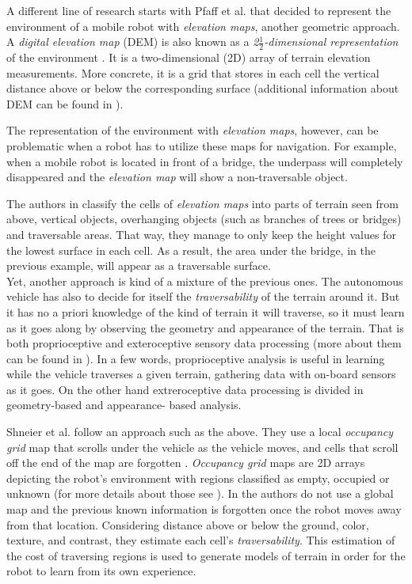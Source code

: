 \documentclass[12pt,a4paper]{report}
\newcommand{\term}{\textit}
\newcommand{\acronym}{\MakeUppercase}
\newcommand{\itfrac}[2]{\frac{\textit{#1}}{\textit{#2}}}
\begin{document}
	A different line of research starts with Pfaff et al. that decided to represent 
	the environment of a mobile robot with \term{elevation maps}, another geometric 
	approach. A \term{digital elevation map} (\acronym{dem}) is also known as a
	\term{2\(\itfrac{1}{2}\)-dimensional representation} of the environment 
	\cite{Pfaff}. It is a two-dimensional (\acronym{2d}) array of terrain elevation 
	measurements. More concrete, it is a grid that stores in each cell the vertical 
	distance above or below the corresponding surface (additional information about 
	\acronym{dem} can be found in \cite{Kweon}). 
	\par 
	The representation of the environment with \term{elevation maps}, however, can 
	be problematic when a robot has to utilize these maps for navigation. For 
	example, when a mobile robot is located in front of a bridge, the underpass will 
	completely disappeared and the \term{elevation map} will show a non-traversable 
	object.
	\par
	The authors in \cite{Pfaff} classify the cells of \term{elevation maps} into 
	parts of terrain seen from above, vertical objects,	overhanging objects (such as 
	branches of trees or bridges) and traversable areas. That way, they manage to 
	only keep the height values for the lowest surface in each cell. As a result, 
	the area under the bridge, in the previous example, will appear as a traversable 
	surface.
	\\
	
	Yet, another approach is kind of a mixture of the previous ones. The autonomous 
	vehicle has also to decide for itself the \term{traversability} of the terrain 
	around it. But it has no a priori knowledge of the kind of terrain it will 
	traverse, so it must learn as it goes along by observing the geometry and 
	appearance of the terrain. That is both proprioceptive and exteroceptive sensory 
	data processing (more about them can be found in \cite{Papadakis}). In a few 
	words, proprioceptive analysis is useful in learning while the vehicle traverses 
	a given terrain, gathering data with on-board sensors as it goes. On the other 
	hand extreroceptive data processing is divided in geometry-based and appearance-
	based analysis. 
	\par
	Shneier et al. follow an approach such as the above. They use a local 
	\term{occupancy grid} map that scrolls under the vehicle as the vehicle moves,
	and cells that scroll off the end of the map are forgotten \cite{Shneier}. 
	\term{Occupancy grid} maps are \acronym{2d} arrays depicting the robot’s 
	environment with regions classified as empty, occupied or unknown (for more 
	details about those see \cite{Moravec}). In \cite{Shneier} the authors do not 
	use a global map and the previous known information is forgotten once the robot 
	moves away from that location. Considering distance above or below the ground, 
	color, texture, and contrast, they estimate each cell’s \term{traversability}. 
	This estimation of the cost of traversing regions is used to generate models of 
	terrain in order for the robot to learn from its own experience.
	\\
	
\end{document}
